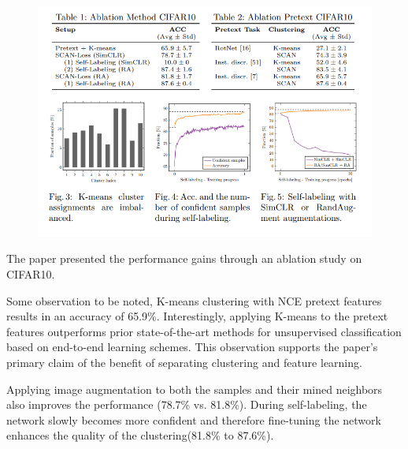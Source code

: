 %
\begin{figure}[!htbp]
\begin{center}
\includegraphics[width=6in]{8.PNG}
\end{center}
\end{figure}

\FloatBarrier

\medskip

The paper presented the performance gains through an ablation study on CIFAR10.



Some observation to be noted, K-means clustering with NCE pretext features results in an accuracy of 65.9\%. Interestingly, applying K-means to the pretext features outperforms prior state-of-the-art methods for unsupervised classification based on end-to-end learning schemes. This observation supports the paper's primary claim of the benefit of separating clustering and feature learning.

Applying image augmentation to both the samples and their mined neighbors also improves the performance (78.7\% vs. 81.8\%). During self-labeling, the network slowly becomes more confident and therefore fine-tuning the network enhances the quality of the clustering(81.8\% to 87.6\%). 


